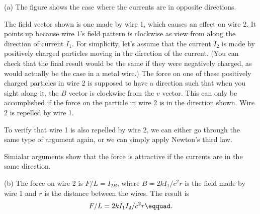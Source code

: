 (a) The figure shows the case where the currents are in
opposite directions.


The field vector shown is one made by wire 1, which causes
an effect on wire 2. It points up because wire 1's field
pattern is clockwise as view from along the direction of
current $I_1$. For simplicity, let's assume that the current
$I_2$ is made by positively charged particles moving in the
direction of the current. (You can check that the final
result would be the same if they were negatively charged, as
would actually be the case in a metal wire.) The force on
one of these positively charged particles in wire 2 is
supposed to have a direction such that when you sight along
it, the $B$ vector is clockwise from the $v$ vector. This
can only be accomplished if the force on the particle in
wire 2 is in the direction shown. Wire 2 is repelled by wire 1.

To verify that wire 1 is also repelled by wire 2, we can
either go through the same type of argument again, or we can
simply apply Newton's third law.

Simialar arguments show that the force is attractive if the
currents are in the same direction.

(b) The force on wire 2 is $F/L=I_{2B}$, where $B=2k I_1/c^2 r$ is the field made by wire 1 and $r$ is the distance
between the wires. The result is
\begin{equation*}
		F/L=2k I_1I_2/c^2 r\eqquad.  
\end{equation*}
